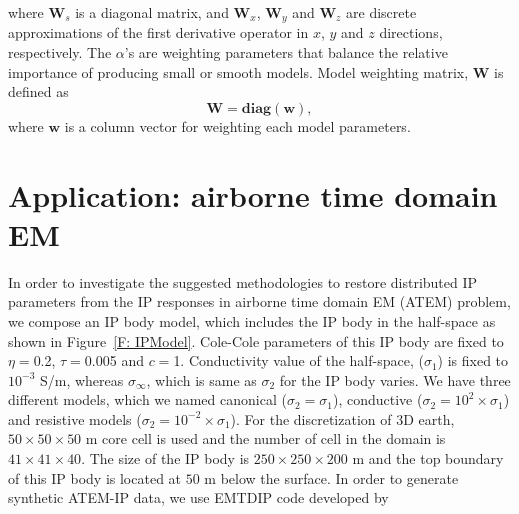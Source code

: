 \documentclass[a4paper, 11pt]{article}
\newcommand{\siginf}{\sigma_\infty}
\begin{document}
where $\mathbf{W}_s$ is a diagonal matrix, and $\mathbf{W}_x$, $\mathbf{W}_y$ and $\mathbf{W}_z$ are discrete approximations of the first derivative operator in $x$, $y$ and $z$ directions, respectively.  The $\alpha$'s are weighting parameters that balance the relative importance of producing small or smooth models. Model weighting matrix, $\mathbf{W}$ is defined as
\begin{equation}
    \mathbf{W} = \mathbf{diag}(\mathbf{w}),
    \label{eq: weight_mat}
\end{equation}
where $\mathbf{w}$ is a column vector for weighting each model parameters.



\section{Application: airborne time domain EM}
In order to investigate the suggested methodologies to restore distributed IP parameters from the IP responses in airborne time domain EM (ATEM) problem, we compose an IP body model, which includes the IP body in the half-space as shown in Figure~\ref{F: IPModel}. Cole-Cole parameters of this IP body are fixed to $\eta=$0.2, $\tau=$0.005 and $c=$1. Conductivity value of the half-space, ($\sigma_1$) is fixed to $10^{-3}$ S/m, whereas $\siginf$, which is same as $\sigma_2$ for the IP body varies. We have three different models, which we named canonical ($\sigma_2=\sigma_1$), conductive ($\sigma_2=10^2\times\sigma_1$) and resistive models ($\sigma_2=10^{-2}\times\sigma_1$).   For the discretization of 3D earth, $50\times50\times50$ m core cell is used and the number of cell in the domain is $41\times41\times40$. The size of the IP body is $250\times250\times200$ m and the top boundary of this IP body is located at $50$ m below the surface. In order to generate synthetic ATEM-IP data, we use EMTDIP code developed by \cite{Marchant2014}
\end{document}
